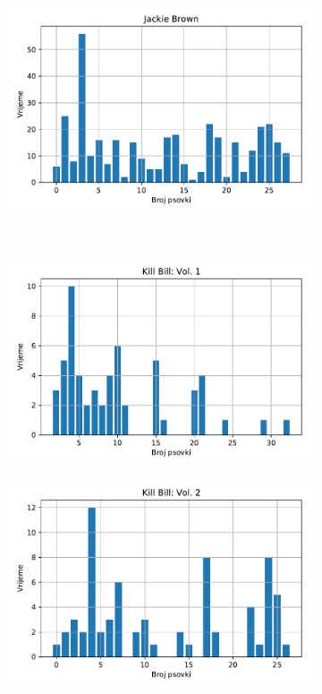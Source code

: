 \documentclass[11pt]{foi}
\begin{document}
\begin{figure}[h]
\begin{subfigure}[t]{0.5\textwidth}
    \end{subfigure}%
    \begin{subfigure}[t]{0.5\textwidth}
        \centering
        \includegraphics{slike/jackie.pdf}
    \end{subfigure}\\
    \begin{subfigure}[t]{0.5\textwidth}
        \centering
        \includegraphics{slike/kill1.pdf}
    \end{subfigure}%
    \begin{subfigure}[t]{0.5\textwidth}
        \centering
        \includegraphics{slike/kill2.pdf}

\end{subfigure}
\end{figure}
\end{document}
